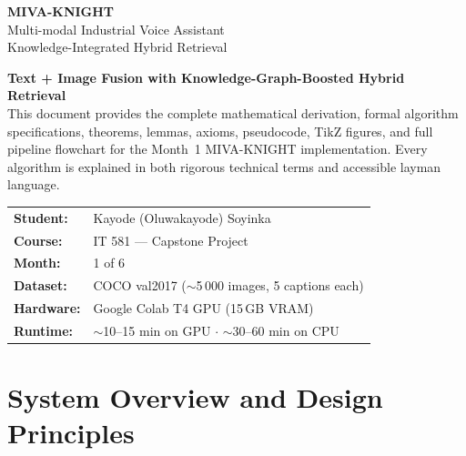 \documentclass[12pt, a4paper]{article}
\theoremstyle{definition}
\theoremstyle{plain}
\theoremstyle{remark}
\begin{document}

\begin{titlepage}
  \centering
  \vspace*{1.5cm}

  {\Huge\bfseries\color{NavyBlue} MIVA-KNIGHT}\\[0.5cm]
  {\Large\color{SlateGray} Multi-modal Industrial Voice Assistant}\\[0.2cm]
  {\Large\color{SlateGray} Knowledge-Integrated Hybrid Retrieval}\\[1.2cm]

  \begin{tcolorbox}[notebox, width=0.88\textwidth,
      title={Month 1 Complete Technical Documentation}]
    \centering
    \textbf{Text + Image Fusion with Knowledge-Graph-Boosted Hybrid Retrieval}\\[0.4cm]
    This document provides the complete mathematical derivation, formal
    algorithm specifications, theorems, lemmas, axioms, pseudocode, TikZ
    figures, and full pipeline flowchart for the Month~1 MIVA-KNIGHT
    implementation.  Every algorithm is explained in both rigorous technical
    terms and accessible layman language.
  \end{tcolorbox}

  \vspace{1.2cm}
  \begin{tabular}{@{}ll}
    \textbf{Student:} & Kayode (Oluwakayode) Soyinka \\[2pt]
    \textbf{Course:}  & IT 581 --- Capstone Project \\[2pt]
    \textbf{Month:}   & 1 of 6 \\[2pt]
    \textbf{Dataset:} & COCO val2017 ($\sim$5\,000 images, 5 captions each) \\[2pt]
    \textbf{Hardware:}& Google Colab T4 GPU (15\,GB VRAM) \\[2pt]
    \textbf{Runtime:} & $\sim$10--15 min on GPU $\cdot$ $\sim$30--60 min on CPU \\
  \end{tabular}

  \vspace{2cm}
  \tableofcontents
\end{titlepage}

\section{System Overview and Design Principles}
\end{document}
